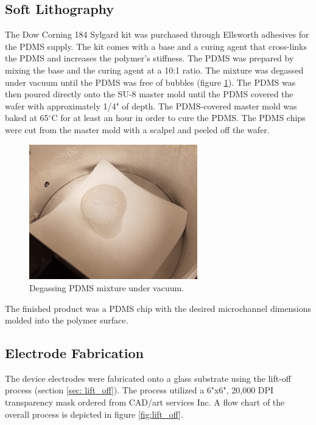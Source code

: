 \FloatBarrier

\subsection*{Soft Lithography}
\par The Dow Corning 184 Sylgard kit was purchased through Ellsworth adhesives for the PDMS supply. The kit comes with a base and a curing agent that cross-links the PDMS and increases the polymer's stiffness. The PDMS was prepared by mixing the base and the curing agent at a 10:1 ratio. The mixture was degassed under vacuum until the PDMS was free of bubbles (figure \ref{fig:pdms_vacuum}). The PDMS was then poured directly onto the SU-8 master mold until the PDMS covered the wafer with approximately 1/4" of depth. The PDMS-covered master mold was baked at 65$^\circ$C for at least an hour in order to cure the PDMS. The PDMS chips were cut from the master mold with a scalpel and peeled off the wafer. 
 


\begin{figure}[h]
    \centering
    \includegraphics[width=0.65\textwidth]{images/pdms_in_vacuum.jpg}
    \caption{Degassing PDMS mixture under vacuum.}
    \label{fig:pdms_vacuum}
\end{figure}


\par The finished product was a PDMS chip with the desired microchannel dimensions molded into the polymer surface.

\subsection{Electrode Fabrication}

\par The device electrodes were fabricated onto a glass substrate using the lift-off process (section \ref{sec: lift_off}). The process utilized a 6"x6", 20,000 DPI transparency mask ordered from CAD/art services Inc. A flow chart of the overall process is depicted in figure \ref{fig:lift_off}.


